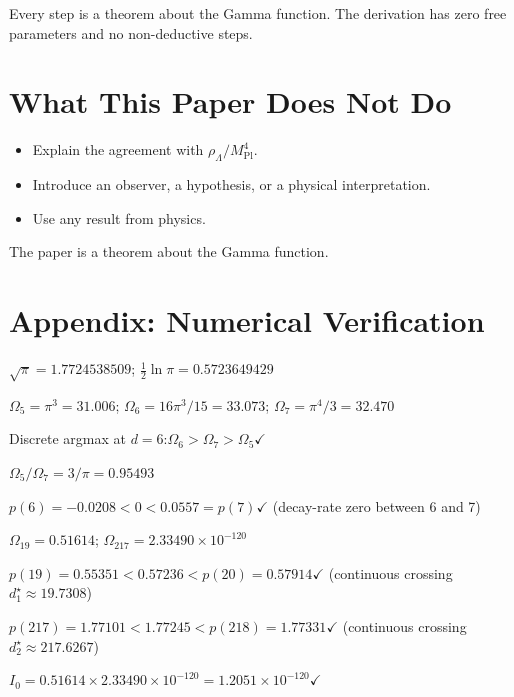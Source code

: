 \documentclass[11pt,a4paper]{article}
\begin{document}
Every step is a theorem about the Gamma function. The derivation has zero
free parameters and no non-deductive steps.

\section{What This Paper Does Not Do}\label{sec:what-this-paper-does-not-do}

\begin{itemize}
\item Explain the agreement with
$\rho_\Lambda/M^4_{\mathrm{Pl}}$.
\item Introduce an observer, a hypothesis, or a physical interpretation.
\item Use any result from physics.
\end{itemize}

The paper is a theorem about the Gamma function.

\section*{Appendix: Numerical Verification}

$\sqrt{\pi} = 1.7724538509$\;;\quad
$\tfrac{1}{2}\ln\pi = 0.5723649429$

$\Omega_5 = \pi^3 = 31.006$\;;\quad
$\Omega_6 = 16\pi^3/15 = 33.073$\;;\quad
$\Omega_7 = \pi^4/3 = 32.470$

Discrete argmax at $d = 6$:\;$\Omega_6 > \Omega_7 > \Omega_5$\;$\checkmark$

$\Omega_5/\Omega_7 = 3/\pi = 0.95493$

$p(6) = -0.0208 < 0 < 0.0557 = p(7)$\;$\checkmark$\quad
(decay-rate zero between 6 and 7)

$\Omega_{19} = 0.51614$\;;\quad
$\Omega_{217} = 2.33490\times 10^{-120}$

$p(19) = 0.55351 < 0.57236 < p(20) = 0.57914$\;$\checkmark$
\quad(continuous crossing $d_1^\star\approx 19.7308$)

$p(217) = 1.77101 < 1.77245 < p(218) = 1.77331$\;$\checkmark$
\quad(continuous crossing $d_2^\star\approx 217.6267$)

$I_0 = 0.51614\times 2.33490\times 10^{-120}
= 1.2051\times 10^{-120}$\;$\checkmark$
\end{document}
